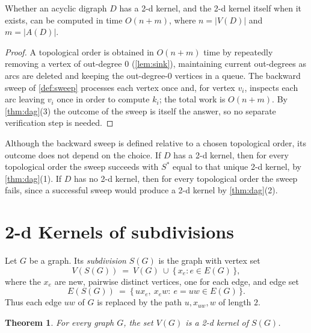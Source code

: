 \documentclass[11pt]{article}
\numberwithin{equation}{section}
\theoremstyle{plain}
\newtheorem{theorem}{Theorem}[section]
\newcommand{\V}{V}
\newcommand{\A}{A}
\begin{document}
\begin{corollary}\label{cor:daglinear}
Whether an acyclic digraph $D$ has a 2-d kernel, and the 2-d kernel itself when it exists,
can be computed in time $O(n+m)$, where $n=|\V(D)|$ and $m=|\A(D)|$.
\end{corollary}

\begin{proof}
A topological order is obtained in $O(n+m)$ time by repeatedly removing a vertex of
out-degree $0$ (\cref{lem:sink}), maintaining current out-degrees as arcs are deleted
and keeping the out-degree-$0$ vertices in a queue. The backward sweep of
\cref{def:sweep} processes each vertex once and, for vertex $v_i$, inspects each arc
leaving $v_i$ once in order to compute $k_i$; the total work is $O(n+m)$. By
\cref{thm:dag}(3) the outcome of the sweep is itself the answer, so no separate
verification step is needed.
\end{proof}

\begin{remark}\label{rem:orderfree}
Although the backward sweep is defined relative to a chosen topological order, its
outcome does not depend on the choice. If $D$ has a 2-d kernel, then for every topological
order the sweep succeeds with $S^\ast$ equal to that unique 2-d kernel, by
\cref{thm:dag}(1). If $D$ has no 2-d kernel, then for every topological order the sweep
fails, since a successful sweep would produce a 2-d kernel by \cref{thm:dag}(2).
\end{remark}

\section{2-d Kernels of subdivisions}
\label{sec:subdivision}

\begin{definition}[Subdivision]\label{def:subdivision}
Let $G$ be a graph. Its \emph{subdivision} $S(G)$ is the graph with vertex set
\[
  \V(S(G))\ =\ \V(G)\ \cup\ \{\,x_e:e\in E(G)\,\},
\]
where the $x_e$ are new, pairwise distinct vertices, one for each edge, and edge set
\[
  E(S(G))\ =\ \{\,ux_e,\ x_ew:\ e=uw\in E(G)\,\}.
\]
Thus each edge $uw$ of $G$ is replaced by the path $u,x_{uw},w$ of length $2$.
\end{definition}

\begin{theorem}\label{thm:subdivision}
For every graph $G$, the set $\V(G)$ is a 2-d kernel of $S(G)$.
\end{theorem}
\end{document}
